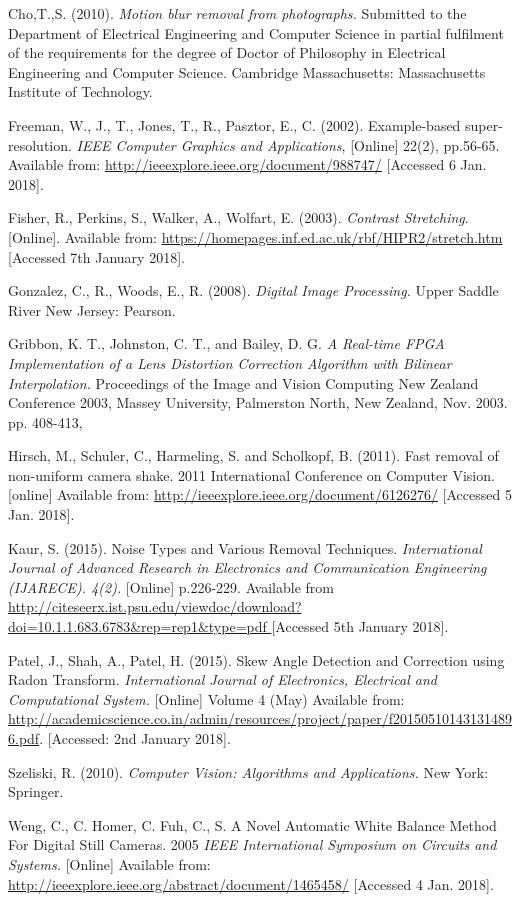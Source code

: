 \documentclass[a4paper, 12pt]{article}
\begin{document}
Cho,T.,S. (2010). \textit{Motion blur removal from photographs.} Submitted to the Department of Electrical Engineering and Computer Science in partial fulfilment of the requirements for the degree of Doctor of Philosophy in Electrical Engineering and Computer Science. Cambridge Massachusetts: Massachusetts Institute of Technology.
 
Freeman, W., J., T., Jones, T., R.,  Pasztor, E., C. (2002). Example-based super-resolution. \textit{IEEE Computer Graphics and Applications}, [Online] 22(2), pp.56-65. Available from: \url{http://ieeexplore.ieee.org/document/988747/} [Accessed 6 Jan. 2018].

Fisher, R., Perkins, S., Walker, A., Wolfart, E. (2003). \textit{Contrast Stretching}. [Online]. Available from: \url{https://homepages.inf.ed.ac.uk/rbf/HIPR2/stretch.htm} [Accessed 7th January 2018].

Gonzalez, C., R., Woods, E., R. (2008). \textit{Digital Image Processing.} Upper Saddle River New Jersey: Pearson.

Gribbon, K. T., Johnston, C. T., and Bailey, D.
G. \textit{A Real-time FPGA Implementation of a
Lens Distortion Correction Algorithm with
Bilinear Interpolation.} Proceedings of the
Image and Vision Computing New Zealand
Conference 2003, Massey University,
Palmerston North, New Zealand, Nov. 2003. pp. 408-413,

Hirsch, M., Schuler, C., Harmeling, S. and Scholkopf, B. (2011). Fast removal of non-uniform camera shake. 2011 International Conference on Computer Vision. [online] Available from: \url{http://ieeexplore.ieee.org/document/6126276/} [Accessed 5 Jan. 2018].

Kaur, S. (2015). Noise Types and Various Removal Techniques. \textit{International Journal of Advanced Research in Electronics and Communication Engineering (IJARECE). 4(2).} [Online] p.226-229. Available from \url{http://citeseerx.ist.psu.edu/viewdoc/download?doi=10.1.1.683.6783&rep=rep1&type=pdf
} [Accessed 5th January 2018].

Patel, J., Shah, A., Patel, H. (2015). Skew Angle Detection and Correction using Radon Transform. \textit{International Journal of Electronics, Electrical and Computational System.} [Online] Volume 4 (May) Available from: \url{http://academicscience.co.in/admin/resources/project/paper/f201505101431314896.pdf}. [Accessed: 2nd January 2018].

Szeliski, R. (2010). \textit{Computer Vision: Algorithms and Applications.} New York: Springer.

Weng, C., C. Homer, C. Fuh, C., S. A Novel Automatic White Balance Method For Digital Still Cameras. 2005 \textit{IEEE International Symposium on Circuits and Systems.} [Online] Available from: \url{http://ieeexplore.ieee.org/abstract/document/1465458/} [Accessed 4 Jan. 2018].
\end{document}
